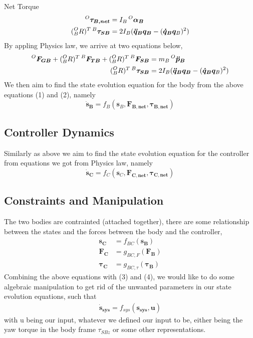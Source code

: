 Net Torque
\begin{align*}
  \prescript{O}{}{\bm{\tau_{B, net}}} &= I_B \prescript{O}{}{\bm{\alpha_B}} \\
  (\prescript{O}{B}{R})^T \prescript{B}{}{\bm{\tau_{SB}}} &= 2I_B(\bm{\ddot{q}_B} \bm{q_B} - (\bm{\dot{q}_B} \bm{q}_B)^2)
\end{align*}
By appling Physics law, we arrive at two equations below,
\begin{align}
  \prescript{O}{}{\bm{F_{GB}}} + (\prescript{O}{B}{R})^T \prescript{B}{}{\bm{F_{TB}}} + (\prescript{O}{B}{R})^T \prescript{B}{}{\bm{F_{SB}}} &= m_B \prescript{O}{}{\bm{\ddot{p}_B}} \\  
  (\prescript{O}{B}{R})^T \prescript{B}{}{\bm{\tau_{SB}}} &= 2I_B(\bm{\ddot{q}_B} \bm{q_B} - (\bm{\dot{q}_B} \bm{q}_B)^2)  
\end{align}
We then aim to find the state evolution equation for the body from the above equations (1) and (2), namely
\begin{equation}
  \bm{\dot{s}_B} = f_B(\bm{s}_B, \bm{F_{B, net}}, \bm{\tau_{B, net}})
\end{equation}
\subsection{Controller Dynamics}
Similarly as above we aim to find the state evolution equation for the controller from equations we got from Physics law, namely
\begin{equation}
  \bm{\dot{s}_C} = f_C(\bm{s}_C, \bm{F_{C, net}}, \bm{\tau_{C, net}})
\end{equation}

\subsection{Constraints and Manipulation}
The two bodies are contrainted (attached together), there are some relationship between the states and the forces between the body and the controller, 
\begin{align}
  \bm{s_C} &= f_{BC}(\bm{s_B}) \\
  \bm{F_C} &= g_{BC,F}(\bm{F_B}) \\
  \bm{\tau_C} &= g_{BC,\tau}(\bm{\tau_B})
\end{align}
Combining the above equations with (3) and (4), we would like to do some algebraic manipulation to get rid of the unwanted parameters in our state evolution equations, such that
\begin{align*}
  \bm{\dot{s}_{sys}} = f_{sys}(\bm{s_{sys}}, \bm{u})
\end{align*}
with u being our input, whatever we defined our input to be, either being the yaw torque in the body frame $\tau_{SBz}$ or some other representations.
